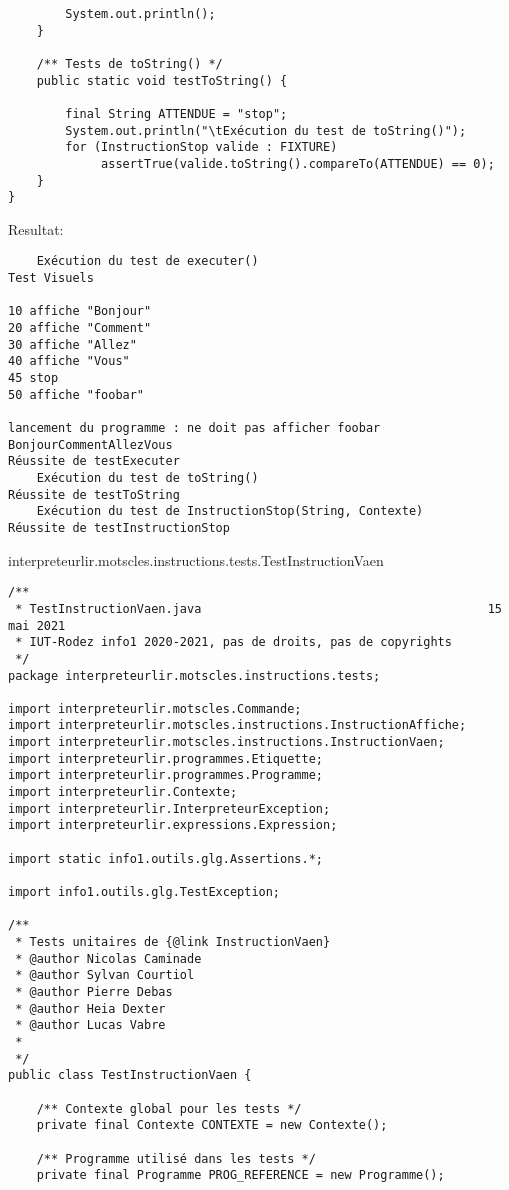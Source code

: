 \begin{enum}
\begin{verbatim}
        System.out.println();
    }
    
    /** Tests de toString() */
    public static void testToString() {
        
        final String ATTENDUE = "stop";
        System.out.println("\tExécution du test de toString()");
        for (InstructionStop valide : FIXTURE)
             assertTrue(valide.toString().compareTo(ATTENDUE) == 0);
    }
}
\end{verbatim}
Resultat:
\begin{verbatim}
    Exécution du test de executer()
Test Visuels

10 affiche "Bonjour"
20 affiche "Comment"
30 affiche "Allez"
40 affiche "Vous"
45 stop
50 affiche "foobar"

lancement du programme : ne doit pas afficher foobar
BonjourCommentAllezVous
Réussite de testExecuter
    Exécution du test de toString()
Réussite de testToString
    Exécution du test de InstructionStop(String, Contexte)
Réussite de testInstructionStop
\end{verbatim}

    \item interpreteurlir.motscles.instructions.tests.TestInstructionVaen
\begin{verbatim}
/**
 * TestInstructionVaen.java                                        15 mai 2021
 * IUT-Rodez info1 2020-2021, pas de droits, pas de copyrights
 */
package interpreteurlir.motscles.instructions.tests;

import interpreteurlir.motscles.Commande;
import interpreteurlir.motscles.instructions.InstructionAffiche;
import interpreteurlir.motscles.instructions.InstructionVaen;
import interpreteurlir.programmes.Etiquette;
import interpreteurlir.programmes.Programme;
import interpreteurlir.Contexte;
import interpreteurlir.InterpreteurException;
import interpreteurlir.expressions.Expression;

import static info1.outils.glg.Assertions.*;

import info1.outils.glg.TestException;

/** 
 * Tests unitaires de {@link InstructionVaen}
 * @author Nicolas Caminade
 * @author Sylvan Courtiol
 * @author Pierre Debas
 * @author Heia Dexter
 * @author Lucas Vabre
 *
 */
public class TestInstructionVaen {

    /** Contexte global pour les tests */
    private final Contexte CONTEXTE = new Contexte();

    /** Programme utilisé dans les tests */
    private final Programme PROG_REFERENCE = new Programme();


\end{verbatim}
\end{enum}
